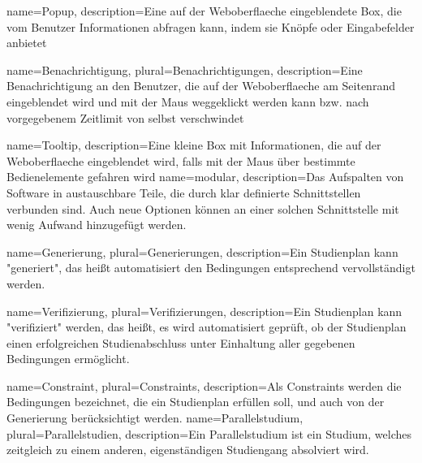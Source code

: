 {
	name=Popup,
	description={Eine auf der \gls{Weboberflaeche} eingeblendete Box, die vom \gls{Benutzer} Informationen abfragen kann, indem sie Knöpfe oder Eingabefelder anbietet}
}

{
	name=Benachrichtigung,
	plural=Benachrichtigungen,
	description={Eine Benachrichtigung an den \gls{Benutzer}, die auf der \gls{Weboberflaeche} am Seitenrand eingeblendet wird und mit der Maus weggeklickt werden kann bzw. nach vorgegebenem Zeitlimit von selbst verschwindet}
}

{
	name=Tooltip,
	description={Eine kleine Box mit Informationen, die auf der \gls{Weboberflaeche} eingeblendet wird, falls mit der Maus über bestimmte Bedienelemente gefahren wird}
}
{
	name=modular,
	description={Das Aufspalten von Software in austauschbare Teile, die durch klar definierte Schnittstellen verbunden sind. Auch neue Optionen können an einer solchen Schnittstelle mit wenig Aufwand hinzugefügt werden.}
}
	
{
	name=Generierung,
	plural=Generierungen,
	description={Ein \gls{Studienplan} kann "generiert", das heißt automatisiert den Bedingungen entsprechend vervollständigt werden.}
}

{
name=Verifizierung,
plural=Verifizierungen,
description={Ein \gls{Studienplan} kann "verifiziert" werden, das heißt, es wird automatisiert geprüft, ob der Studienplan einen erfolgreichen Studienabschluss unter Einhaltung aller gegebenen Bedingungen ermöglicht.}
}

{
name=Constraint,
plural=Constraints,
description={Als Constraints werden die Bedingungen bezeichnet, die ein \gls{Studienplan} erfüllen soll, und auch von der \gls{Generierung} berücksichtigt werden.}
}
{
name=Parallelstudium,
plural=Parallelstudien,
description={Ein Parallelstudium ist ein Studium, welches zeitgleich zu einem anderen, eigenständigen Studiengang absolviert wird.}
}